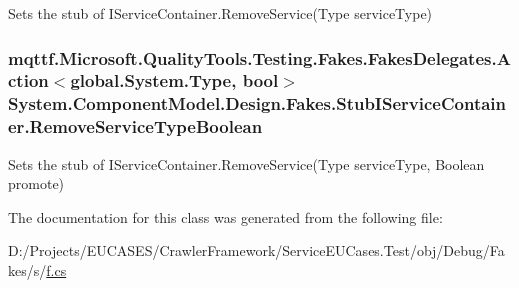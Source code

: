 Sets the stub of I\-Service\-Container.\-Remove\-Service(\-Type service\-Type)

\hypertarget{class_system_1_1_component_model_1_1_design_1_1_fakes_1_1_stub_i_service_container_a76c5caefae87400a21a807b548e6f646}{
\subsubsection[{Remove\-Service\-Type\-Boolean}]{\setlength{\rightskip}{0pt plus 5cm}mqttf.\-Microsoft.\-Quality\-Tools.\-Testing.\-Fakes.\-Fakes\-Delegates.\-Action$<$global.\-System.\-Type, bool$>$ System.\-Component\-Model.\-Design.\-Fakes.\-Stub\-I\-Service\-Container.\-Remove\-Service\-Type\-Boolean}}\label{class_system_1_1_component_model_1_1_design_1_1_fakes_1_1_stub_i_service_container_a76c5caefae87400a21a807b548e6f646}


Sets the stub of I\-Service\-Container.\-Remove\-Service(\-Type service\-Type, Boolean promote)



The documentation for this class was generated from the following file\-:\begin{DoxyCompactItemize}
\item 
D\-:/\-Projects/\-E\-U\-C\-A\-S\-E\-S/\-Crawler\-Framework/\-Service\-E\-U\-Cases.\-Test/obj/\-Debug/\-Fakes/s/\hyperlink{s_2f_8cs}{f.\-cs}\end{DoxyCompactItemize}
